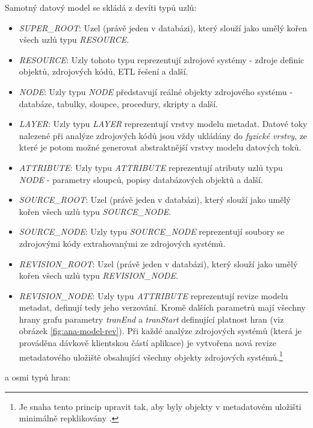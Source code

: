 Samotný datový model se skládá z devíti typů uzlů:

\begin{itemize}
	\item{\textit{SUPER\_ROOT}}: Uzel (právě jeden v databázi), který slouží jako umělý kořen všech uzlů typu \textit{RESOURCE}.
	\item{\textit{RESOURCE}}: Uzly tohoto typu reprezentují zdrojové systémy - zdroje definic objektů, zdrojových kódů, ETL řešení a další.
	\item{\textit{NODE}}: Uzly typu \textit{NODE} představují reálné objekty zdrojového systému - databáze, tabulky, sloupce, procedury, skripty a další.
	\item{\textit{LAYER}}: Uzly typu \textit{LAYER} reprezentují vrstvy modelu metadat. Datové toky nalezené při analýze zdrojových kódů jsou vždy ukládány do \textit{fyzické vrstvy}, ze které je potom možné generovat abstraktnější vrstvy modelu datových toků.
	\item{\textit{ATTRIBUTE}}: Uzly typu \textit{ATTRIBUTE} reprezentují atributy uzlů typu \textit{NODE} - parametry sloupců, popisy databázových objektů a další.
	\item{\textit{SOURCE\_ROOT}}: Uzel (právě jeden v databázi), který slouží jako umělý kořen všech uzlů typu \textit{SOURCE\_NODE}.
	\item{\textit{SOURCE\_NODE}}: Uzly typu \textit{SOURCE\_NODE} reprezentují soubory se zdrojovými kódy extrahovanými ze zdrojových systémů.
	\item{\textit{REVISION\_ROOT}}: Uzel (právě jeden v databázi), který slouží jako umělý kořen všech uzlů typu \textit{REVISION\_NODE}.
	\item{\textit{REVISION\_NODE}}: Uzly typu \textit{ATTRIBUTE} reprezentují revize modelu metadat, definují tedy jeho verzování. Kromě dalších parametrů mají všechny hrany grafu parametry \textit{tranEnd} a \textit{tranStart} definující platnost hran (viz obrázek \ref{fig:ana-model-rev}). Při každé analýze zdrojových systémů (která je prováděna dávkově klientskou částí aplikace) je vytvořena nová revize metadatového uložiště obsahující všechny objekty zdrojových systémů.\footnote{Je snaha tento princip upravit tak, aby byly objekty v metadatovém uložišti minimálně repklikovány \cite{Sykora17}.}
\end{itemize}

 a osmi typů hran:

